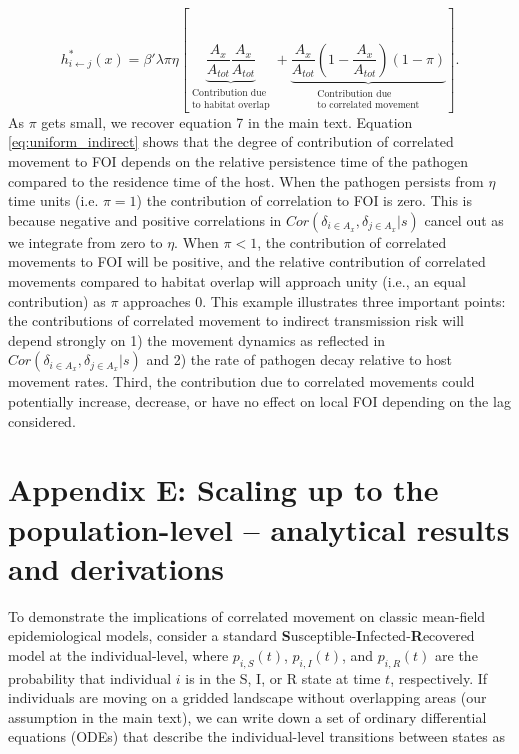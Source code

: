 \documentclass[11pt]{article}
\begin{document}
\begin{equation}
    h^*_{i \leftarrow j}(x) = \beta' \lambda \pi \eta \left[ \underbrace{\frac{A_x}{A_{tot}}\frac{A_x}{A_{tot}}}_{\substack{\text{Contribution due} \\ \text{to habitat overlap}}} + \underbrace{\frac{A_x}{A_{tot}}(1 - \frac{A_x}{A_{tot}}) (1 - \pi)}_{\substack{\text{Contribution due} \\ \text{to correlated movement}}} \right].
    \label{eq:uniform_indirect}
\end{equation}
As $\pi$ gets small, we recover equation 7 in the main text.  Equation \ref{eq:uniform_indirect} shows that the degree of contribution of correlated movement to FOI depends on the relative persistence time of the pathogen compared to the residence time of the host.  
When the pathogen persists from $\eta$ time units (i.e. $\pi = 1$) the contribution of correlation to FOI is zero.  This is because negative and positive correlations in $Cor(\delta_{i \in A_x}, \delta_{j \in A_x} | s)$ cancel out as we integrate from zero to $\eta$.  
When $\pi < 1$, the contribution of correlated movements to FOI will be positive, and the relative contribution of correlated movements compared to habitat overlap will approach unity (i.e., an equal contribution) as $\pi$ approaches 0. 
This example illustrates three important points: the contributions of correlated movement to indirect transmission risk will depend strongly on 1) the movement dynamics as reflected in $Cor(\delta_{i \in A_x}, \delta_{j \in A_x} | s)$ and 2) the rate of pathogen decay relative to host movement rates.  Third, the contribution due to correlated movements could potentially increase, decrease, or have no effect on local FOI depending on the lag considered.  

\section*{Appendix E: Scaling up to the population-level -- analytical results and derivations}

To demonstrate the implications of correlated movement on classic mean-field epidemiological models, consider a standard \textbf{S}usceptible-\textbf{I}nfected-\textbf{R}ecovered model at the individual-level, where $p_{i, S}(t)$, $p_{i, I}(t)$, and $p_{i, R}(t)$ are the probability that individual $i$ is in the S, I, or R state at time $t$, respectively.  If individuals are moving on a gridded landscape without overlapping areas (our assumption in the main text), we can write down a set of ordinary differential equations (ODEs) that describe the individual-level transitions between states as
\end{document}

